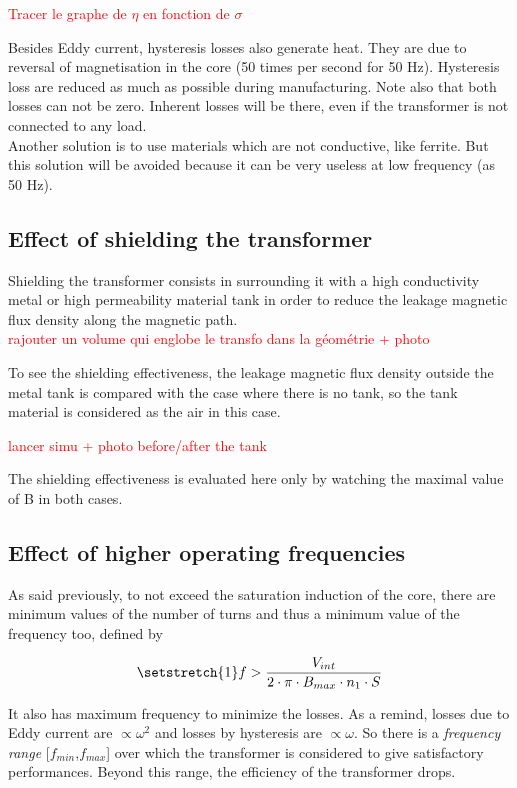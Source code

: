 \documentclass[12pt,a4paper]{report}
\begin{document}
\textcolor{red}{Tracer le graphe de $\eta$ en fonction de $\sigma$}

Besides Eddy current, hysteresis losses also generate heat. They are due to reversal of magnetisation in the core (50 times per second for 50 Hz). Hysteresis loss are reduced as much as possible during manufacturing. Note also that both losses can not be zero. Inherent losses will be there, even if the transformer is not connected to any load.\\

Another solution is to use materials which are not conductive, like ferrite.
But this solution will be avoided because it can be very useless at low frequency (as 50 Hz).

\subsection{Effect of shielding the transformer}
Shielding the transformer consists in surrounding it with a high conductivity metal or high permeability material tank in order to reduce the leakage magnetic flux density along the magnetic path.\\

\textcolor{red}{rajouter un volume qui englobe le transfo dans la géométrie + photo}

To see the shielding effectiveness, the leakage magnetic flux density outside the metal tank is compared with the case where there is no tank, so the tank material is considered as the air in this case.

\textcolor{red}{lancer simu + photo before/after the tank}

The shielding effectiveness is evaluated here only by watching the maximal value of B in both cases.


\subsection{Effect of higher operating frequencies}
As said previously, to not exceed the saturation induction of the core, there are minimum values of the number of turns and thus a minimum value of the frequency too, defined by

\begin{equation}
\setstretch{1}
    f > \frac{V_{int}}{2 \cdot \pi \cdot B_{max}\cdot n_1 \cdot S}\label{eq:f_min}
\end{equation}

It also has maximum frequency to minimize the losses. As a remind, losses due to Eddy current are $\propto \omega^2$ and losses by hysteresis are $\propto \omega$. So there is a \textit{frequency range} [$f_{min}$,$f_{max}$] over which the transformer is considered to give satisfactory performances. Beyond this range, the efficiency of the transformer drops.
\end{document}
